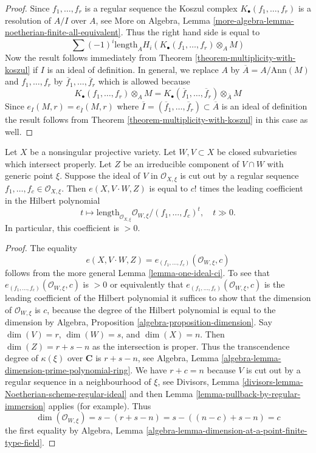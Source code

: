 \begin{proof}
Since $f_1, \ldots, f_r$ is a regular sequence the Koszul complex
$K_\bullet(f_1, \ldots, f_r)$ is a resolution of $A/I$ over $A$, see
More on Algebra, Lemma
\ref{more-algebra-lemma-noetherian-finite-all-equivalent}.
Thus the right hand side is equal to
$$
\sum (-1)^i\text{length}_A H_i(K_\bullet(f_1, \ldots, f_r) \otimes_A M)
$$
Now the result follows immediately from
Theorem \ref{theorem-multiplicity-with-koszul} if $I$ is an ideal
of definition. In general, we replace $A$ by $\overline{A} = A/\text{Ann}(M)$
and $f_1, \ldots, f_r$ by $\overline{f}_1, \ldots, \overline{f}_r$
which is allowed because
$$
K_\bullet(f_1, \ldots, f_r) \otimes_A M =
K_\bullet(\overline{f}_1, \ldots, \overline{f}_r) \otimes_{\overline{A}} M
$$
Since $e_I(M, r) = e_{\overline{I}}(M, r)$ where
$\overline{I} = (\overline{f}_1, \ldots, \overline{f}_r) \subset \overline{A}$
is an ideal of definition the result follows from
Theorem \ref{theorem-multiplicity-with-koszul} in this case as well.
\end{proof}

\begin{lemma}
\label{lemma-multiplicity-with-lci}
Let $X$ be a nonsingular projective variety. Let $W,V \subset X$ be
closed subvarieties which intersect properly. Let $Z$ be an irreducible
component of $V \cap W$ with generic point $\xi$.
Suppose the ideal of $V$ in $\mathcal{O}_{X, \xi}$ is cut out by
a regular sequence $f_1, \ldots, f_c \in \mathcal{O}_{X, \xi}$.
Then $e(X, V\cdot W, Z)$ is equal to $c!$ times the leading coefficient in
the Hilbert polynomial
$$
t \mapsto \text{length}_{\mathcal{O}_{X, \xi}}
\mathcal{O}_{W, \xi}/(f_1, \ldots, f_c)^t,\quad t \gg 0.
$$
In particular, this coefficient is $> 0$.
\end{lemma}

\begin{proof}
The equality
$$
e(X, V\cdot W, Z) = e_{(f_1, \dots, f_c)}(\mathcal{O}_{W, \xi}, c)
$$
follows from the more general Lemma \ref{lemma-one-ideal-ci}.
To see that $e_{(f_1, \dots, f_c)}(\mathcal{O}_{W, \xi}, c)$ is
$> 0$ or equivalently that $e_{(f_1, \dots, f_c)}(\mathcal{O}_{W, \xi}, c)$
is the leading coefficient of the Hilbert polynomial
it suffices to show that the
dimension of $\mathcal{O}_{W, \xi}$ is $c$, because the degree of the
Hilbert polynomial is equal to the dimension by
Algebra, Proposition \ref{algebra-proposition-dimension}.
Say $\dim(V) = r$, $\dim(W) = s$, and $\dim(X) = n$. Then
$\dim(Z) = r + s - n$ as the intersection is proper. Thus
the transcendence degree of $\kappa(\xi)$ over $\mathbf{C}$ is
$r + s - n$, see Algebra, Lemma
\ref{algebra-lemma-dimension-prime-polynomial-ring}.
We have $r + c = n$ because $V$ is cut out by a regular sequence
in a neighbourhood of $\xi$, see
Divisors, Lemma \ref{divisors-lemma-Noetherian-scheme-regular-ideal}
and then Lemma \ref{lemma-pullback-by-regular-immersion}
applies (for example). Thus
$$
\dim(\mathcal{O}_{W, \xi}) = s - (r + s - n) = s - ((n - c) + s - n) = c
$$
the first equality by Algebra, Lemma
\ref{algebra-lemma-dimension-at-a-point-finite-type-field}.
\end{proof}

